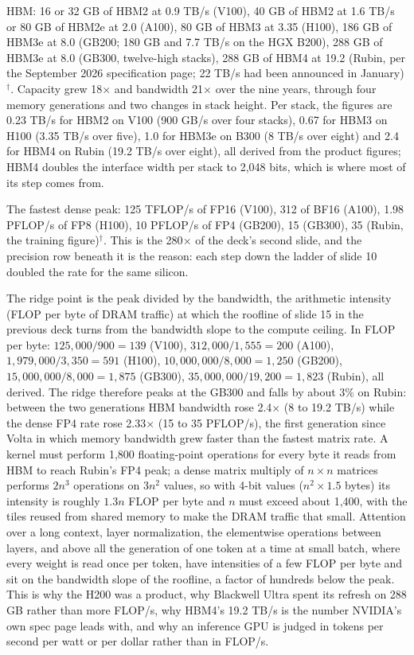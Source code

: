 \documentclass[11pt,letterpaper]{article}
\begin{document}
HBM: 16 or 32 GB of HBM2 at 0.9 TB/s (V100), 40 GB of HBM2 at 1.6 TB/s or 80 GB of HBM2e at 2.0 (A100), 80 GB of HBM3 at 3.35 (H100), 186 GB of HBM3e at 8.0 (GB200; 180 GB and 7.7 TB/s on the HGX B200), 288 GB of HBM3e at 8.0 (GB300, twelve-high stacks), 288 GB of HBM4 at 19.2 (Rubin, per the September 2026 specification page; 22 TB/s had been announced in January)$^\dagger$. Capacity grew 18$\times$ and bandwidth 21$\times$ over the nine years, through four memory generations and two changes in stack height. Per stack, the figures are 0.23 TB/s for HBM2 on V100 (900 GB/s over four stacks), 0.67 for HBM3 on H100 (3.35 TB/s over five), 1.0 for HBM3e on B300 (8 TB/s over eight) and 2.4 for HBM4 on Rubin (19.2 TB/s over eight), all derived from the product figures; HBM4 doubles the interface width per stack to 2{,}048 bits, which is where most of its step comes from.

The fastest dense peak: 125 TFLOP/s of FP16 (V100), 312 of BF16 (A100), 1.98 PFLOP/s of FP8 (H100), 10 PFLOP/s of FP4 (GB200), 15 (GB300), 35 (Rubin, the training figure)$^\dagger$. This is the 280$\times$ of the deck's second slide, and the precision row beneath it is the reason: each step down the ladder of slide 10 doubled the rate for the same silicon.

The ridge point is the peak divided by the bandwidth, the arithmetic intensity (FLOP per byte of DRAM traffic) at which the roofline of slide 15 in the previous deck turns from the bandwidth slope to the compute ceiling. In FLOP per byte: $125{,}000/900 = 139$ (V100), $312{,}000/1{,}555 = 200$ (A100), $1{,}979{,}000/3{,}350 = 591$ (H100), $10{,}000{,}000/8{,}000 = 1{,}250$ (GB200), $15{,}000{,}000/8{,}000 = 1{,}875$ (GB300), $35{,}000{,}000/19{,}200 = 1{,}823$ (Rubin), all derived. The ridge therefore peaks at the GB300 and falls by about 3\% on Rubin: between the two generations HBM bandwidth rose 2.4$\times$ (8 to 19.2 TB/s) while the dense FP4 rate rose 2.33$\times$ (15 to 35 PFLOP/s), the first generation since Volta in which memory bandwidth grew faster than the fastest matrix rate. A kernel must perform 1{,}800 floating-point operations for every byte it reads from HBM to reach Rubin's FP4 peak; a dense matrix multiply of $n\times n$ matrices performs $2n^3$ operations on $3n^2$ values, so with 4-bit values ($n^2\times 1.5$ bytes) its intensity is roughly $1.3n$ FLOP per byte and $n$ must exceed about 1{,}400, with the tiles reused from shared memory to make the DRAM traffic that small. Attention over a long context, layer normalization, the elementwise operations between layers, and above all the generation of one token at a time at small batch, where every weight is read once per token, have intensities of a few FLOP per byte and sit on the bandwidth slope of the roofline, a factor of hundreds below the peak. This is why the H200 was a product, why Blackwell Ultra spent its refresh on 288 GB rather than more FLOP/s, why HBM4's 19.2 TB/s is the number NVIDIA's own spec page leads with, and why an inference GPU is judged in tokens per second per watt or per dollar rather than in FLOP/s.
\end{document}
